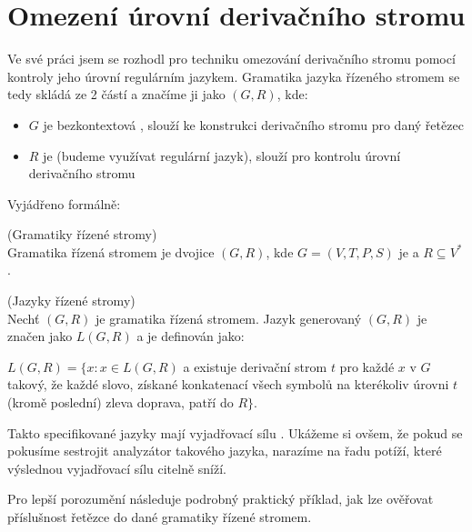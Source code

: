 \section{Omezení úrovní derivačního stromu}

Ve své práci jsem se rozhodl pro techniku omezování derivačního stromu pomocí
kontroly jeho úrovní regulárním jazykem.
Gramatika jazyka řízeného stromem se tedy skládá ze 2 částí a značíme ji jako
$(G, R)$, kde:
\begin{itemize}
  \item $G$ je bezkontextová , slouží ke konstrukci derivačního stromu
  pro daný řetězec
  \item $R$ je  (budeme využívat regulární jazyk),
  slouží pro kontrolu úrovní derivačního stromu
\end{itemize}

\noindent
Vyjádřeno formálně:

\begin{defn}
  (Gramatiky řízené stromy)\\
  Gramatika řízená stromem je dvojice $(G, R)$, kde $G = (V, T, P, S)$
  je  a $R \subseteq V^*$ .
\end{defn}

\begin{defn}
  \label{defn:treeControlledLanguages}
  (Jazyky řízené stromy)\\
  Nechť $(G, R)$ je gramatika řízená stromem.
  Jazyk generovaný $(G, R)$ je značen jako $L(G, R)$ a je definován jako:
  \vspace{5pt}
  \begin{adjustwidth}{0.5cm}{0.5cm}
    $L(G, R) = \{x: x \in L(G, R)$ a existuje derivační strom $t$ pro
    každé $x$ v $G$ takový, že každé slovo, získané konkatenací
    všech symbolů na kterékoliv úrovni $t$ (kromě poslední) zleva doprava,
    patří do $R\}$.
  \end{adjustwidth}
\end{defn}

\noindent
Takto specifikované jazyky mají vyjadřovací sílu .\cite{Koutny}
Ukážeme si ovšem, že pokud se pokusíme sestrojit analyzátor takového jazyka,
narazíme na řadu potíží, které výslednou vyjadřovací sílu citelně sníží.

Pro lepší porozumění následuje podrobný praktický příklad, jak lze
ověřovat příslušnost řetězce do dané gramatiky řízené stromem.

